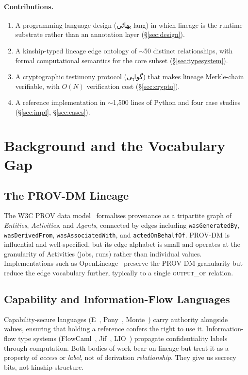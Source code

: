 \documentclass[10pt,twocolumn]{article}
\newcommand{\ur}[1]{{\urdufont #1}}
\begin{document}
\paragraph{Contributions.}
\begin{enumerate}
\item A programming-language design (\ur{بھائی}-lang) in which lineage is the runtime substrate rather than an annotation layer (\S\ref{sec:design}).
\item A kinship-typed lineage edge ontology of $\sim$50 distinct relationships, with formal computational semantics for the core sub\-set (\S\ref{sec:typesystem}).
\item A cryptographic testimony protocol (\ur{گواہی}) that makes lineage Merkle-chain verifiable, with $O(N)$ verification cost (\S\ref{sec:crypto}).
\item A reference implementation in $\sim$1{,}500 lines of Python and four case studies (\S\ref{sec:impl}, \S\ref{sec:cases}).
\end{enumerate}

\section{Background and the Vocabulary Gap}
\label{sec:background}

\subsection{The PROV-DM Lineage}

The W3C PROV data model~\cite{prov-dm} formalises provenance as a tripartite graph of \emph{Entities}, \emph{Activities}, and \emph{Agents}, connected by edges including \texttt{wasGeneratedBy}, \texttt{wasDerivedFrom}, \texttt{wasAssociatedWith}, and \texttt{actedOnBehalfOf}. PROV-DM is influential and well-specified, but its edge alphabet is small and operates at the granularity of Activities (jobs, runs) rather than individual values. Implementations such as OpenLineage~\cite{openlineage} preserve the PROV-DM granularity but reduce the edge vocabulary further, typically to a single \textsc{output\_of} relation.

\subsection{Capability and Information-Flow Languages}

Capability-secure languages (E~\cite{e-language}, Pony~\cite{pony}, Monte~\cite{monte}) carry authority alongside values, ensuring that holding a reference confers the right to use it. Information-flow type systems (FlowCaml~\cite{flowcaml}, Jif~\cite{jif}, LIO~\cite{lio}) propagate confidentiality labels through computation. Both bodies of work bear on lineage but treat it as a property of \emph{access} or \emph{label}, not of derivation \emph{relationship}. They give us secrecy bits, not kinship structure.
\end{document}
